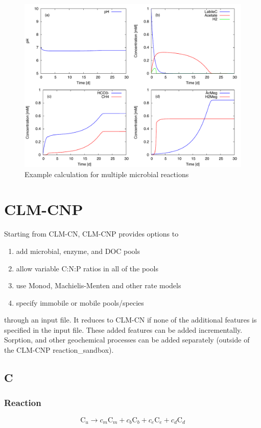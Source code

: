 \documentclass[12pt, a4paper]{article}
\begin{document}
\begin{figure}[h]
\centering
\includegraphics[width=1.0\textwidth]{../microbial/comp.pdf}
\caption{Example calculation for multiple microbial reactions}
\label{Fig5}
\end{figure}

\clearpage
\section{CLM-CNP}
Starting from CLM-CN, CLM-CNP provides options to
\begin{enumerate}
\item add microbial, enzyme, and DOC pools
\item allow variable C:N:P ratios in all of the pools
\item use Monod, Machielis-Menten and other rate models
\item specify immobile or mobile pools/species
\end{enumerate}

through an input file. It reduces to CLM-CN if none of the additional features is specified in the input file. These added features can be added incrementally. Sorption, and other geochemical processes can be added separately (outside of the CLM-CNP reaction\_sandbox).

\subsection{C}
\subsubsection{Reaction}
\begin{equation}
\label{rxnc}
\text{C}_u \rightarrow c_m\text{C}_m + c_b\text{C}_b + c_e \text{C}_e + c_d \text{C}_d
\end{equation}
\end{document}
